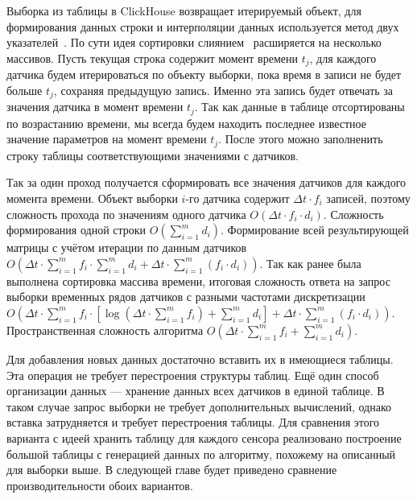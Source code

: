 Выборка из таблицы в ClickHouse возвращает итерируемый объект, для формирования данных строки и интерполяции данных используется метод двух указателей~\cite{two-pointers}. По сути идея сортировки слиянием~\cite{mergesort} расширяется на несколько массивов. Пусть текущая строка содержит момент времени $t_j$, для каждого датчика будем итерироваться по объекту выборки, пока время в записи не будет больше $t_j$, сохраняя предыдущую запись. Именно эта запись будет отвечать за значения датчика в момент времени $t_j$. Так как данные в таблице отсортированы по возрастанию времени, мы всегда будем находить последнее известное значение параметров на момент времени $t_j$. После этого можно заполненить строку таблицы соответствующими значениями с датчиков.

Так за один проход получается сформировать все значения датчиков для каждого момента времени. Объект выборки $i$-го датчика содержит ${\Delta}t \cdot f_i$ записей, поэтому сложность прохода по значениям одного датчика $O({\Delta}t \cdot f_i \cdot d_i)$. Сложность формирования одной строки $O(\sum^{m}_{i=1}{d_i})$. Формирование всей результирующей матрицы с учётом итерации по данным датчиков $O({\Delta}t \cdot \sum^{m}_{i=1}{f_i} \cdot \sum^{m}_{i=1}{d_i} + {\Delta}t \cdot \sum^{m}_{i=1}{(f_i \cdot d_i)})$. Так как ранее была выполнена сортировка массива времени, итоговая сложность ответа на запрос выборки временных рядов датчиков с разными частотами дискретизации $O({\Delta}t \cdot \sum^{m}_{i=1}{f_i} \cdot [\log({\Delta}t \cdot \sum^{m}_{i=1}{f_i}) + \sum^{m}_{i=1}{d_i}] + {\Delta}t \cdot \sum^{m}_{i=1}{(f_i \cdot d_i)})$. Пространственная сложность алгоритма $O({\Delta}t \cdot \sum^{m}_{i=1}{f_i} + \sum^{m}_{i=1}{d_i})$.

Для добавления новых данных достаточно вставить их в имеющиеся таблицы. Эта операция не требует перестроения структуры таблиц. Ещё один способ организации данных --- хранение данных всех датчиков в единой таблице. В таком случае запрос выборки не требует дополнительных вычислений, однако вставка затрудняется и требует перестроения таблицы. Для сравнения этого варианта с идеей хранить таблицу для каждого сенсора реализовано построение большой таблицы с генерацией данных по алгоритму, похожему на описанный для выборки выше. В следующей главе будет приведено сравнение производительности обоих вариантов.